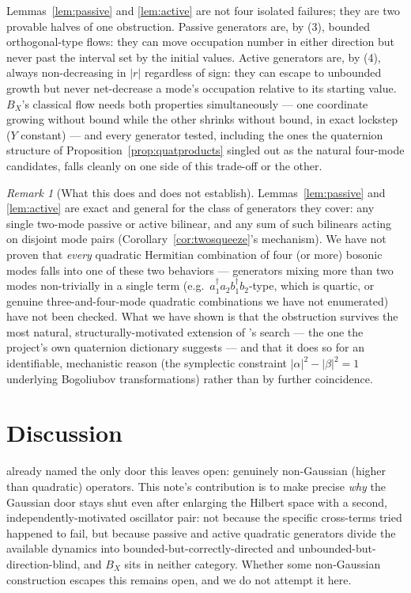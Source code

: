 \documentclass[12pt]{amsart}
\theoremstyle{plain}
\theoremstyle{remark}
\newtheorem*{remark}{Remark}
\begin{document}
Lemmas~\ref{lem:passive} and \ref{lem:active} are not four isolated failures; they are two provable halves of one obstruction. Passive generators are, by (3), bounded orthogonal-type flows: they can move occupation number in either direction but never past the interval set by the initial values. Active generators are, by (4), always non-decreasing in $|r|$ regardless of sign: they can escape to unbounded growth but never net-decrease a mode's occupation relative to its starting value. $B_X$'s classical flow needs both properties simultaneously --- one coordinate growing without bound while the other shrinks without bound, in exact lockstep ($Y$ constant) --- and every generator tested, including the ones the quaternion structure of Proposition~\ref{prop:quatproducts} singled out as the natural four-mode candidates, falls cleanly on one side of this trade-off or the other.

\begin{remark}[What this does and does not establish]
Lemmas~\ref{lem:passive} and \ref{lem:active} are exact and general for the class of generators they cover: any single two-mode passive or active bilinear, and any sum of such bilinears acting on disjoint mode pairs (Corollary~\ref{cor:twosqueeze}'s mechanism). We have not proven that \emph{every} quadratic Hermitian combination of four (or more) bosonic modes falls into one of these two behaviors --- generators mixing more than two modes non-trivially in a single term (e.g.\ $a_1^\dagger a_2b_1^\dagger b_2$-type, which is quartic, or genuine three-and-four-mode quadratic combinations we have not enumerated) have not been checked. What we have shown is that the obstruction survives the most natural, structurally-motivated extension of \cite{Ebert2026Quantum}'s search --- the one the project's own quaternion dictionary suggests --- and that it does so for an identifiable, mechanistic reason (the symplectic constraint $|\alpha|^2-|\beta|^2=1$ underlying Bogoliubov transformations) rather than by further coincidence.
\end{remark}

\section{Discussion}

\cite{Ebert2026Quantum} already named the only door this leaves open: genuinely non-Gaussian (higher than quadratic) operators. This note's contribution is to make precise \emph{why} the Gaussian door stays shut even after enlarging the Hilbert space with a second, independently-motivated oscillator pair: not because the specific cross-terms tried happened to fail, but because passive and active quadratic generators divide the available dynamics into bounded-but-correctly-directed and unbounded-but-direction-blind, and $B_X$ sits in neither category. Whether some non-Gaussian construction escapes this remains open, and we do not attempt it here.
\end{document}
